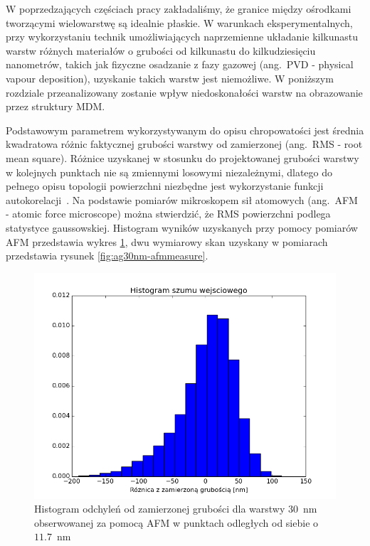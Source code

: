 W poprzedzających częściach pracy zakładaliśmy, że granice między ośrodkami tworzącymi wielowarstwę są idealnie płaskie. W warunkach eksperymentalnych, przy wykorzystaniu technik umożliwiających naprzemienne układanie kilkunastu warstw różnych materiałów o grubości od kilkunastu do kilkudziesięciu nanometrów,  takich jak fizyczne osadzanie z fazy gazowej (ang.~PVD - physical vapour deposition), uzyskanie takich warstw jest niemożliwe. W poniższym rozdziale przeanalizowany zostanie wpływ niedoskonałości warstw na obrazowanie przez struktury MDM.

Podstawowym parametrem wykorzystywanym do opisu chropowatości jest średnia kwadratowa różnic faktycznej grubości warstwy od zamierzonej (ang.~RMS - root mean square). Różnice uzyskanej w stosunku do projektowanej grubości warstwy w kolejnych punktach nie są zmiennymi losowymi niezależnymi, dlatego do pełnego opisu topologii powierzchni niezbędne jest wykorzystanie funkcji autokorelacji~\cite{stefaniuk2011effect}. Na podstawie pomiarów mikroskopem sił atomowych (ang.~AFM - atomic force microscope) można stwierdzić, że RMS powierzchni podlega statystyce gaussowskiej. Histogram wyników uzyskanych przy pomocy pomiarów AFM przedstawia wykres \ref{fig:ag30nm-afmhist}, dwu wymiarowy skan uzyskany w pomiarach przedstawia rysunek \ref{fig:ag30nm-afmmeasure}.

\begin{figure}[bt]
		\includegraphics[width=\textwidth]{images/multilayer/ag30nm-afm-measure-hist.png}
		\caption{Histogram odchyleń od zamierzonej grubości dla warstwy $30$~nm obserwowanej za pomocą AFM w punktach odległych od siebie o $11.7$~nm} 		\label{fig:ag30nm-afmhist}
\end{figure}

